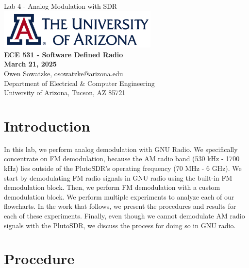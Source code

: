 \documentclass{article}
\begin{document}
\begin{titlepage}
	\centering
	{\huge Lab 4 - Analog Modulation with SDR}\\[0.25 in]
	\includegraphics[width=0.6\textwidth]{ua_logo.png}\\[0.25 in]
	{\large \textbf{ECE 531 - Software Defined Radio\\[0.25 in]
	March 21, 2025\\[0.25 in]}}
	{\large Owen Sowatzke, osowatzke@arizona.edu\\[0.05 in]
	Department of Electrical \& Computer Engineering\\[0.05 in]
	University of Arizona, Tucson, AZ 85721\\[0.5 in]}
	\hypersetup{linkcolor=navy-blue}
	\noindent\hrulefill
	\tableofcontents
	\noindent\hrulefill
\end{titlepage}


\section{Introduction}

In this lab, we perform analog demodulation with GNU Radio. We specifically concentrate on FM demodulation, because the AM radio band (530 kHz - 1700 kHz) lies outside of the PlutoSDR's operating frequency (70 MHz - 6 GHz). We start by demodulating FM radio signals in GNU radio using the built-in FM demodulation block. Then, we perform FM demodulation with a custom demodulation block. We perform multiple experiments to analyze each of our flowcharts. In the work that follows, we present the procedures and results for each of these experiments. Finally, even though we cannot demodulate AM radio signals with the PlutoSDR, we discuss the process for doing so in GNU radio.  

\section{Procedure}
\end{document}

